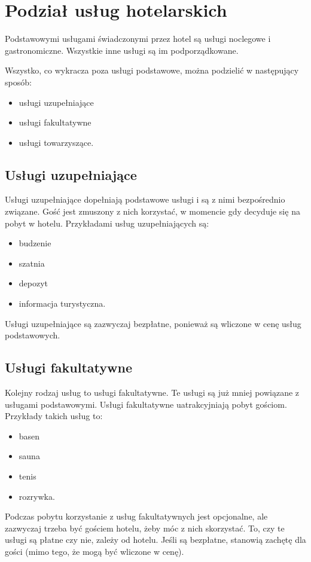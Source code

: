 \documentclass[a4paper,onecolumn,oneside,11pt,wide,floatssmall]{mwrep}
\theoremstyle{definition}
\theoremstyle{plain}%
\theoremstyle{remark}
\begin{document}
\section{Podział usług hotelarskich}   
Podstawowymi usługami świadczonymi przez hotel są usługi noclegowe i 
gastronomiczne. Wszystkie inne usługi są im podporządkowane.

Wszystko, co wykracza poza usługi podstawowe, można podzielić w następujący 
sposób:
  \begin{itemize}
    \item usługi uzupełniające
    \item usługi fakultatywne
    \item usługi towarzyszące.
  \end{itemize}

\subsection{Usługi uzupełniające}
Usługi uzupełniające dopełniają podstawowe usługi i są z nimi bezpośrednio 
związane. Gość jest zmuszony z nich korzystać, w momencie gdy decyduje się na 
pobyt w hotelu. Przykładami usług uzupełniających są:

\begin{itemize}
  \item budzenie
  \item szatnia
  \item depozyt
  \item informacja turystyczna.
\end{itemize}

Usługi uzupełniające są zazwyczaj bezpłatne, ponieważ są wliczone w cenę 
usług podstawowych.

\subsection{Usługi fakultatywne}
Kolejny rodzaj usług to usługi fakultatywne. Te usługi są już mniej 
powiązane z usługami podstawowymi. Usługi fakultatywne uatrakcyjniają pobyt 
gościom. Przykłady takich usług to:

\begin{itemize}
  \item basen
  \item sauna
  \item tenis
  \item rozrywka.
\end{itemize}

Podczas pobytu korzystanie z usług fakultatywnych jest opcjonalne, ale zazwyczaj trzeba być 
gościem hotelu, żeby móc z nich skorzystać. To, czy te usługi są płatne czy 
nie, zależy od hotelu.  Jeśli są bezpłatne, stanowią zachętę dla gości (mimo 
tego, że mogą być wliczone w cenę).
\end{document}
